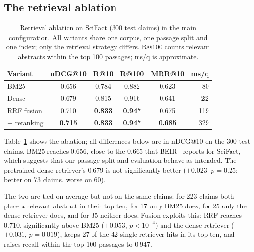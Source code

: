 \documentclass[runningheads]{llncs}
\begin{document}
\subsection{The retrieval ablation}

\begin{table}[t]
\centering\footnotesize
\caption{Retrieval ablation on SciFact (300 test claims) in the main
configuration. All variants share one corpus, one passage split and one index;
only the retrieval strategy differs. R@100 counts relevant abstracts within the
top 100 passages; ms/q is approximate.}
\label{tab:ablation}
\begin{tabular}{@{}lccccr@{}}
\toprule
Variant & nDCG@10 & R@10 & R@100 & MRR@10 & ms/q \\
\midrule
BM25            & 0.656 & 0.784 & 0.882 & 0.623 & 80 \\
Dense           & 0.679 & 0.815 & 0.916 & 0.641 & \textbf{22} \\
RRF fusion      & 0.710 & \textbf{0.833} & \textbf{0.947} & 0.675 & 119 \\
\; $+$ reranking & \textbf{0.715} & \textbf{0.833} & \textbf{0.947} & \textbf{0.685} & 329 \\
\bottomrule
\end{tabular}
\end{table}

Table~\ref{tab:ablation} shows the ablation; all differences below are in nDCG@10
on the 300 test claims. BM25 reaches 0.656, close to the 0.665 that
BEIR~\cite{thakur2021beir} reports for SciFact, which suggests that our passage
split and evaluation behave as intended.
The pretrained dense retriever's 0.679 is not significantly better ($+0.023$,
$p=0.25$; better on 73 claims, worse on 60).

The two are tied on average but not on the same claims: for 223 claims both place
a relevant abstract in their top ten, for 17 only BM25 does, for 25 only the dense
retriever does, and for 35 neither does. Fusion exploits this: RRF reaches 0.710,
significantly above BM25 ($+0.053$, $p<10^{-4}$) and the dense retriever
($+0.031$, $p=0.019$), keeps 27 of the 42 single-retriever hits in its top ten,
and raises recall within the top 100 passages to 0.947.
\end{document}
